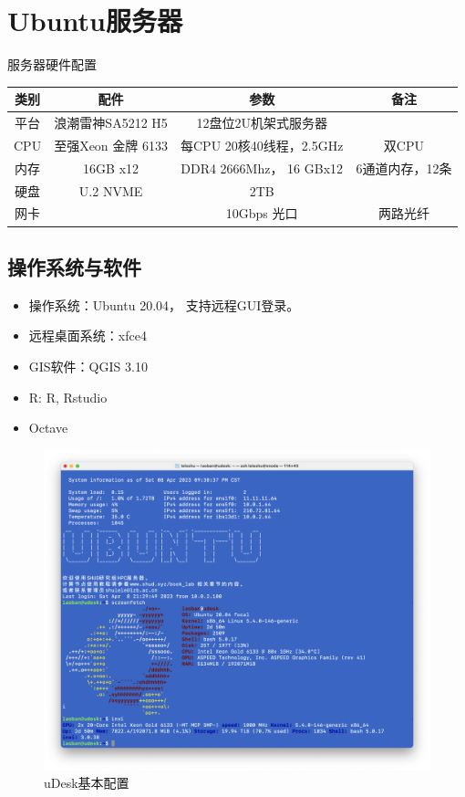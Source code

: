 \documentclass[
]{ctexbook}
\providecommand{\tightlist}{%
  \setlength{\itemsep}{0pt}\setlength{\parskip}{0pt}}
\begin{document}
\hypertarget{ubuntuux670dux52a1ux5668}{%
\section{Ubuntu服务器}\label{ubuntuux670dux52a1ux5668}}

服务器硬件配置

\begin{longtable}[]{@{}cccc@{}}
\toprule\noalign{}
类别 & 配件 & 参数 & 备注 \\
\midrule\noalign{}
\endhead
\bottomrule\noalign{}
\endlastfoot
平台 & 浪潮雷神SA5212 H5 & 12盘位2U机架式服务器 & \\
CPU & 至强Xeon 金牌 6133 & 每CPU 20核40线程，2.5GHz & 双CPU \\
内存 & 16GB x12 & DDR4 2666Mhz， 16 GBx12 & 6通道内存，12条 \\
硬盘 & U.2 NVME & 2TB & \\
网卡 & & 10Gbps 光口 & 两路光纤 \\
\end{longtable}

\hypertarget{ux64cdux4f5cux7cfbux7edfux4e0eux8f6fux4ef6-1}{%
\subsection{操作系统与软件}\label{ux64cdux4f5cux7cfbux7edfux4e0eux8f6fux4ef6-1}}

\begin{itemize}
\tightlist
\item
  操作系统：Ubuntu 20.04， 支持远程GUI登录。
\item
  远程桌面系统：xfce4
\item
  GIS软件：QGIS 3.10
\item
  R: R, Rstudio
\item
  Octave
\end{itemize}

\begin{figure}
\centering
\includegraphics{Fig/ch5/host_udesk.png}
\caption{uDesk基本配置}
\end{figure}
\end{document}
